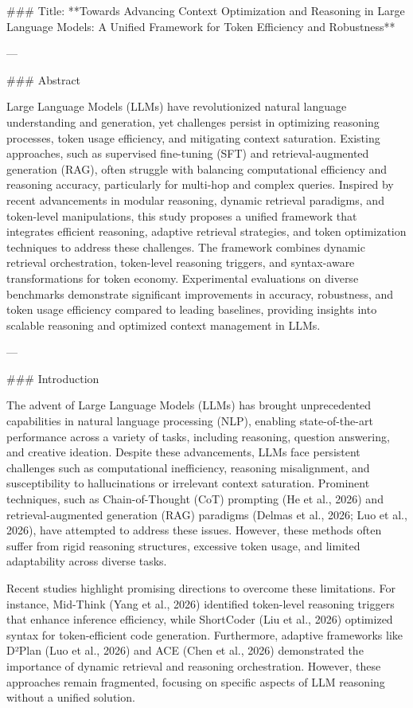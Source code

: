 ### Title: **Towards Advancing Context Optimization and Reasoning in Large Language Models: A Unified Framework for Token Efficiency and Robustness**

---

### Abstract

Large Language Models (LLMs) have revolutionized natural language understanding and generation, yet challenges persist in optimizing reasoning processes, token usage efficiency, and mitigating context saturation. Existing approaches, such as supervised fine-tuning (SFT) and retrieval-augmented generation (RAG), often struggle with balancing computational efficiency and reasoning accuracy, particularly for multi-hop and complex queries. Inspired by recent advancements in modular reasoning, dynamic retrieval paradigms, and token-level manipulations, this study proposes a unified framework that integrates efficient reasoning, adaptive retrieval strategies, and token optimization techniques to address these challenges. The framework combines dynamic retrieval orchestration, token-level reasoning triggers, and syntax-aware transformations for token economy. Experimental evaluations on diverse benchmarks demonstrate significant improvements in accuracy, robustness, and token usage efficiency compared to leading baselines, providing insights into scalable reasoning and optimized context management in LLMs.

---

### Introduction

The advent of Large Language Models (LLMs) has brought unprecedented capabilities in natural language processing (NLP), enabling state-of-the-art performance across a variety of tasks, including reasoning, question answering, and creative ideation. Despite these advancements, LLMs face persistent challenges such as computational inefficiency, reasoning misalignment, and susceptibility to hallucinations or irrelevant context saturation. Prominent techniques, such as Chain-of-Thought (CoT) prompting (He et al., 2026) and retrieval-augmented generation (RAG) paradigms (Delmas et al., 2026; Luo et al., 2026), have attempted to address these issues. However, these methods often suffer from rigid reasoning structures, excessive token usage, and limited adaptability across diverse tasks.

Recent studies highlight promising directions to overcome these limitations. For instance, Mid-Think (Yang et al., 2026) identified token-level reasoning triggers that enhance inference efficiency, while ShortCoder (Liu et al., 2026) optimized syntax for token-efficient code generation. Furthermore, adaptive frameworks like D²Plan (Luo et al., 2026) and ACE (Chen et al., 2026) demonstrated the importance of dynamic retrieval and reasoning orchestration. However, these approaches remain fragmented, focusing on specific aspects of LLM reasoning without a unified solution.

